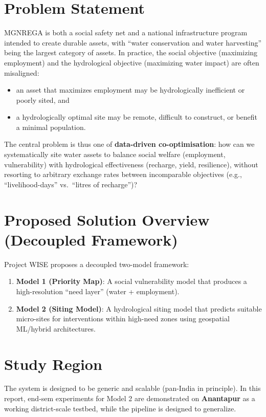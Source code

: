 \documentclass[12pt,a4paper]{report}
\begin{document}
\section{Problem Statement}
MGNREGA is both a social safety net and a national infrastructure program intended to create durable assets, with “water conservation and water harvesting” being the largest category of assets. In practice, the social objective (maximizing employment) and the hydrological objective (maximizing water impact) are often misaligned:
\begin{itemize}
  \item an asset that maximizes employment may be hydrologically inefficient or poorly sited, and
  \item a hydrologically optimal site may be remote, difficult to construct, or benefit a minimal population.
\end{itemize}

The central problem is thus one of \textbf{data-driven co-optimisation}: how can we systematically site water assets to balance social welfare (employment, vulnerability) with hydrological effectiveness (recharge, yield, resilience), without resorting to arbitrary exchange rates between incomparable objectives (e.g., “livelihood-days” vs.\ “litres of recharge”)?

\section{Proposed Solution Overview (Decoupled Framework)}
Project WISE proposes a decoupled two-model framework:
\begin{enumerate}[label=\textbf{M\arabic*.}]
  \item \textbf{Model 1 (Priority Map)}: A social vulnerability model that produces a high-resolution “need layer” (water + employment).
  \item \textbf{Model 2 (Siting Model)}: A hydrological siting model that predicts suitable micro-sites for interventions within high-need zones using geospatial ML/hybrid architectures.
\end{enumerate}

\section{Study Region}
The system is designed to be generic and scalable (pan-India in principle). In this report, end-sem experiments for Model 2 are demonstrated on \textbf{Anantapur} as a working district-scale testbed, while the pipeline is designed to generalize.
\end{document}
